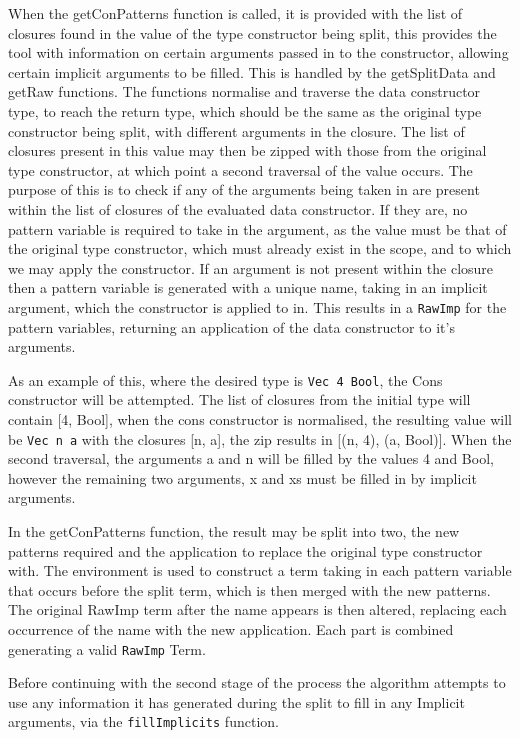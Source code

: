 \documentclass[a4paper]{article}
\begin{document}
When the getConPatterns function is called, it is provided with the list of
closures found in the value of the type constructor being split, this
provides the tool with information on certain arguments passed in to
the constructor, allowing certain implicit arguments to be filled.
This is handled by the getSplitData and getRaw functions.
The functions normalise and traverse the data constructor type, to reach
the return type, which should be the same as the original type constructor being split, with
different arguments in the closure.
The list of closures present in this value may then be zipped with those from
the original type constructor, at which point a second traversal of the value occurs.
The purpose of this is to check if any of the arguments being taken in are present within the list of closures 
of the evaluated data constructor. If they are, no pattern variable
is required to take in the argument, as the value must be that of the original type constructor, which must
already exist in the scope, and to which we may apply the constructor.
If an argument is not present within the closure then a pattern variable is generated with a unique name, taking in
an implicit argument, which the constructor is applied to in.
This results in a \texttt{RawImp} for the pattern variables, returning an application of the data constructor
to it's arguments.

As an example of this, where the desired type is \texttt{Vec 4 Bool}, the Cons constructor will be attempted.
The list of closures from the initial type will contain [4, Bool], when the cons constructor is normalised,
the resulting value will be \texttt{Vec n a} with the closures [n, a], the zip results in [(n, 4), (a, Bool)].
When the second traversal, the arguments a and n will be filled by the values 4 and Bool, however the remaining
two arguments, x and xs must be filled in by implicit arguments.

In the getConPatterns function, the result may be split into two, the new patterns required and the
application to replace the original type constructor with. The environment is used to construct a term
taking in each pattern variable that occurs before the split term, which is then merged with the new patterns.
The original RawImp term after the name appears is then altered, replacing each occurrence of the name with
the new application. Each part is combined generating a valid \texttt{RawImp} Term.

Before continuing with the second stage of the process
the algorithm attempts to use any information it has generated during the split
to fill in any Implicit arguments, via the \texttt{fillImplicits} function.
\end{document}
